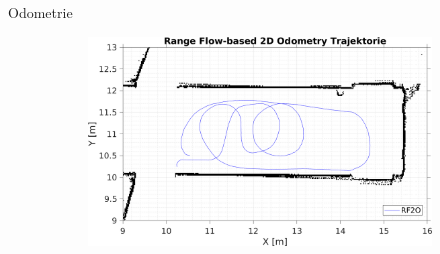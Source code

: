 \documentclass{beamer}
\begin{document}
\begin{frame}{Odometrie}
\begin{figure}
\begin{subfigure}{0.47\linewidth}
		\end{subfigure}
		\hfill
		\begin{subfigure}{0.47\linewidth}
			\centering
			\includegraphics[width=\linewidth]{Record_2018-02-08-12-33-53_trajectory4}
		\end{subfigure}
	\end{figure}

\end{frame}
\end{document}
